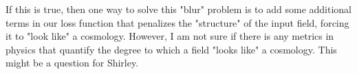 \documentclass{article}
\begin{document}
If this is true, then one way to solve this "blur" problem is to add some additional terms in our loss function that penalizes the "structure" of the input field, forcing it to "look like" a cosmology. However, I am not sure if there is any metrics in physics that quantify the degree to which a field "looks like" a cosmology. This might be a question for Shirley.

\clearpage
{}

\end{document}
